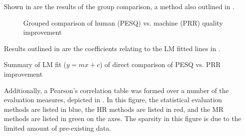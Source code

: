 Shown in  are the results of the group comparison,
a method also outlined in .

\begin{figure}[h]

\protect\caption{\label{fig:Group-PESQ-PRR}Grouped comparison of human (\acs{PESQ})
vs. machine (\acs{PRR}) quality improvement}
\end{figure}


Results outlined in  are the
coefficients relating to the \ac{LM} fitted lines in .

\begin{table}[h]
\protect\caption{\label{tab:LF-Fit-Direct-Compar-PESQ-PRR}Summary of \acs{LM} fit
($y=mx+c$) of direct comparison of \acs{PESQ} vs. \acs{PRR} improvement}


\centering{}
\end{table}


Additionally, a Pearson's correlation table was formed over a number
of the evaluation measures, depicted in . In this
figure, the statistical evaluation methods are listed in blue, the
\ac{HR} methods are listed in red, and the \ac{MR} methods are listed
in green on the axes. The sparsity in this figure is due to the limited
amount of pre-existing data.

